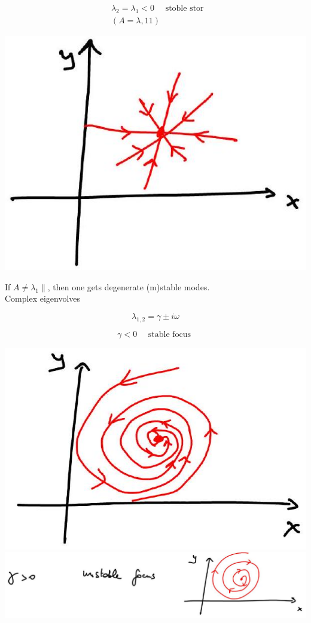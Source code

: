 \documentclass[10pt]{article}
\begin{document}
$$
\begin{aligned}
& \lambda_{2}=\lambda_{1}<0 \quad \text { stoble stor } \\
& (A=\lambda, 11)
\end{aligned}
$$

\begin{center}
\includegraphics[max width=\textwidth]{2025_10_19_55a7d61d84e6ce9a1c8cg-5(1)}
\end{center}

If $A \neq \lambda_{1} \|$, then one gets degenerate (m)stable modes.\\
Complex eigenvolves

$$
\lambda_{1,2}=\gamma \pm i \omega
$$

$$
\gamma<0 \quad \text { stable focus }
$$

\includegraphics[max width=\textwidth, center]{2025_10_19_55a7d61d84e6ce9a1c8cg-5(3)}\\
\includegraphics[max width=\textwidth, center]{2025_10_19_55a7d61d84e6ce9a1c8cg-5(4)}
\end{document}
